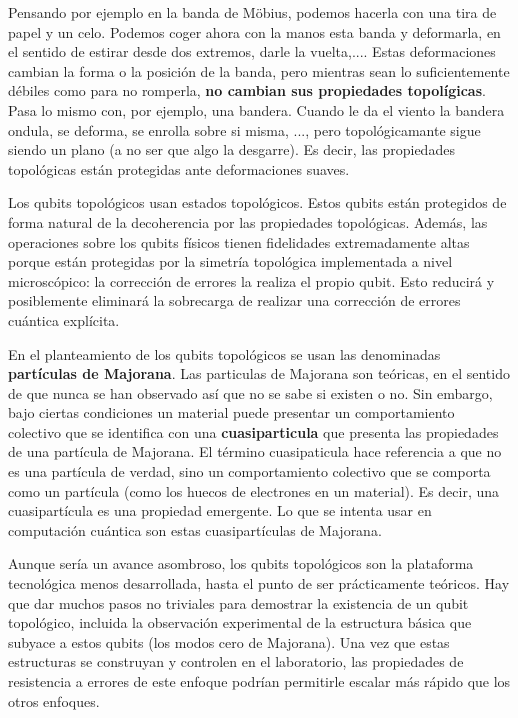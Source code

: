 Pensando por ejemplo en la banda de Möbius, podemos hacerla con una tira de papel y un celo. Podemos coger ahora con la manos esta banda y deformarla, en el sentido de estirar desde dos extremos, darle la vuelta,.... Estas deformaciones cambian la forma o la posición de la banda, pero mientras sean lo suficientemente débiles como para no romperla, \textbf{no cambian sus propiedades topolígicas}. Pasa lo mismo con, por ejemplo, una bandera. Cuando le da el viento la bandera ondula, se deforma, se enrolla sobre si misma, ..., pero topológicamante sigue siendo un plano (a no ser que algo la desgarre). Es decir, las propiedades topológicas están protegidas ante deformaciones suaves. 

Los qubits topológicos usan estados topológicos. Estos qubits están protegidos de forma natural de la decoherencia por las propiedades topológicas. Además, las operaciones sobre los qubits físicos tienen fidelidades extremadamente altas porque están protegidas por la simetría topológica implementada a nivel microscópico: la corrección de errores la realiza el propio qubit. Esto reducirá y posiblemente eliminará la sobrecarga de realizar una corrección de errores cuántica explícita. 

En el planteamiento de los qubits topológicos se usan las denominadas \textbf{partículas de Majorana}. Las particulas de Majorana son teóricas, en el sentido de que nunca se han observado así que no se sabe si existen o no. Sin embargo, bajo ciertas condiciones un material puede presentar un comportamiento colectivo que se identifica con una \textbf{cuasiparticula} que presenta las propiedades de una partícula de Majorana. El término cuasipaticula hace referencia a que no es una partícula de verdad, sino un comportamiento colectivo que se comporta como un partícula (como los huecos de electrones en un material). Es decir, una cuasipartícula es una propiedad emergente. Lo que se intenta usar en computación cuántica son estas cuasipartículas de Majorana.

Aunque sería un avance asombroso, los qubits topológicos son la plataforma tecnológica menos desarrollada, hasta el punto de ser prácticamente teóricos. Hay que dar muchos pasos no triviales para demostrar la existencia de un qubit topológico, incluida la observación experimental de la estructura básica que subyace a estos qubits (los modos cero de Majorana). Una vez que estas estructuras se construyan y controlen en el laboratorio, las propiedades de resistencia a errores de este enfoque podrían permitirle escalar más rápido que los otros enfoques.


